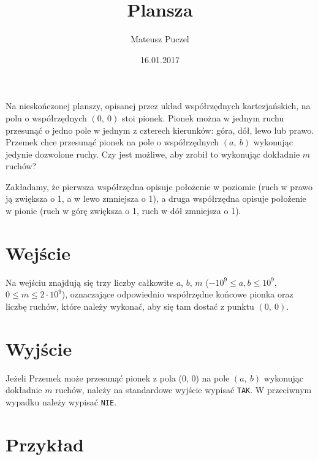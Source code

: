 \documentclass[zad,zawodnik,utf8]{sinol}
\title{Plansza}
\author{Mateusz Puczel} %
\date{16.01.2017}
\begin{document}
\begin{tasktext}%
Na nieskończonej planszy, opisanej przez układ współrzędnych kartezjańskich, na polu o współrzędnych $(0,~0)$ stoi pionek. Pionek można w jednym ruchu przesunąć o jedno pole w jednym z czterech kierunków: góra, dół, lewo lub prawo.
Przemek chce przesunąć pionek na pole o współrzędnych $(a,~b)$ wykonując jedynie dozwolone ruchy. Czy jest możliwe, aby zrobił to wykonując dokładnie $m$ ruchów?

Zakładamy, że pierwsza współrzędna opisuje położenie w poziomie (ruch w prawo ją zwiększa o 1, a w lewo zmniejsza o 1),
a druga współrzędna opisuje położenie w pionie (ruch w górę zwiększa o 1, ruch w dół zmniejsza o 1).

  \section{Wejście}
Na wejściu znajdują się trzy liczby całkowite $a$, $b$, $m$ ($-10^9 \leq a, b \leq 10^9$, $0 \leq m \leq 2 \cdot 10^9$), oznaczające odpowiednio współrzędne
końcowe pionka oraz liczbę ruchów, które należy wykonać, aby się tam dostać z punktu $(0,~0)$.

  \section{Wyjście}
Jeżeli Przemek może przesunąć pionek z pola (0, 0) na pole $(a,~b)$ wykonując dokładnie $m$ ruchów, należy na standardowe wyjście wypisać \texttt{TAK}.
W przeciwnym wypadku należy wypisać \texttt{NIE}.
  
\section{Przykład}

\end{tasktext}
\end{document}

